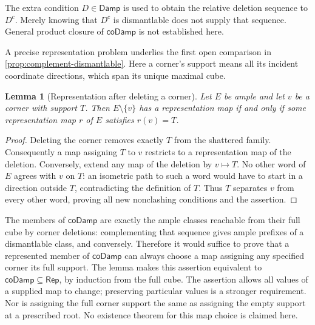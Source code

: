 \documentclass[11pt]{article}
\newtheorem{lemma}[proposition]{Lemma}
\theoremstyle{definition}
\newcommand{\Damp}{\mathsf{Damp}}
\newcommand{\Rep}{\mathsf{Rep}}
\begin{document}
The extra condition $D\in\Damp$ is used to obtain the relative deletion
sequence to $D^c$. Merely knowing that $D^c$ is dismantlable does not
supply that sequence. General product closure of $\mathsf{coDamp}$ is
not established here.

A precise representation problem underlies the first open comparison in
\cref{prop:complement-dismantlable}. Here a corner's support means all its
incident coordinate directions, which span its unique maximal cube.
\begin{lemma}[Representation after deleting a corner]
\label{lem:corner-representation-deletion}
Let $E$ be ample and let $v$ be a corner with support $T$. Then
$E\setminus\{v\}$ has a representation map if and only if some
representation map $r$ of $E$ satisfies $r(v)=T$.
\end{lemma}
\begin{proof}
Deleting the corner removes exactly $T$ from the shattered family.
Consequently a map assigning $T$ to $v$ restricts to a representation
map of the deletion. Conversely, extend any map of the deletion by
$v\mapsto T$. No other word of $E$ agrees with $v$ on $T$: an isometric
path to such a word would have to start in a direction outside $T$,
contradicting the definition of $T$. Thus $T$ separates $v$ from every
other word, proving all new nonclashing conditions and the assertion.
\end{proof}

The members of $\mathsf{coDamp}$ are exactly the ample classes reachable
from their full cube by corner deletions: complementing that sequence
gives ample prefixes of a dismantlable class, and conversely.
Therefore it would suffice to prove that a represented member of
$\mathsf{coDamp}$ can always choose a map assigning any specified corner
its full support. The lemma makes this assertion equivalent to
$\mathsf{coDamp}\subseteq\Rep$, by induction from the full cube.
The assertion allows all values of a supplied map to change; preserving
particular values is a stronger requirement. Nor is assigning the full
corner support the same as assigning the empty support at a prescribed
root. No existence theorem for this map choice is claimed here.
\end{document}
